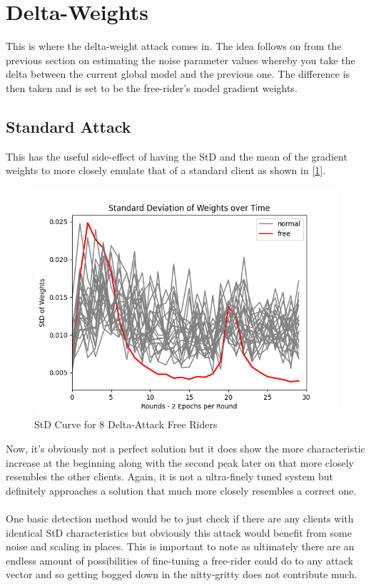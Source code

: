 \section{Delta-Weights}
This is where the delta-weight attack comes in.
The idea follows on from the previous section on estimating the noise parameter values whereby you take the delta between the current global model and the previous one.
The difference is then taken and is set to be the free-rider's model gradient weights.

\subsection{Standard Attack}

This has the useful side-effect of having the StD and the mean of the gradient weights to more closely emulate that of a standard client as shown in [\ref{fig:std_delta}].
\begin{figure}[htbp]
	\centering
    \includegraphics[scale=0.5]{free_riders/graphs/delta8.png}
	\caption{StD Curve for 8 Delta-Attack Free Riders}
	\label{fig:std_delta}
\end{figure}

Now, it's obviously not a perfect solution but it does show the more characteristic increase at the beginning along with the second peak later on that more closely resembles the other clients.
Again, it is not a ultra-finely tuned system but definitely approaches a solution that much more closely resembles a correct one.
\\ \\ 
One basic detection method would be to just check if there are any clients with identical StD characteristics but obviously this attack would benefit from some noise and scaling in places.
This is important to note as ultimately there are an endless amount of possibilities of fine-tuning a free-rider could do to any attack vector and so getting bogged down in the nitty-gritty does not contribute much.


